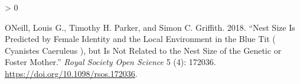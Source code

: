 \documentclass[
]{book}
\newlength{\cslhangindent}
\newenvironment{CSLReferences}[2] %
 {%
  \setlength{\parindent}{0pt}
  \ifodd #1 \everypar{\setlength{\hangindent}{\cslhangindent}}\ignorespaces\fi
  \ifnum #2 > 0
  \setlength{\parskip}{#2\baselineskip}
  \fi
 }%
 {}
\begin{document}
\hypertarget{refs}{}
\begin{CSLReferences}{1}{0}
\leavevmode\hypertarget{ref-O_Neill_2018}{}%
ONeill, Louis G., Timothy H. Parker, and Simon C. Griffith. 2018.
{``Nest Size Is Predicted by Female Identity and the Local Environment
in the Blue Tit ( Cyanistes Caeruleus ), but Is Not Related to the Nest
Size of the Genetic or Foster Mother.''} \emph{Royal Society Open
Science} 5 (4): 172036. \url{https://doi.org/10.1098/rsos.172036}.

\end{CSLReferences}

\backmatter
\end{document}

